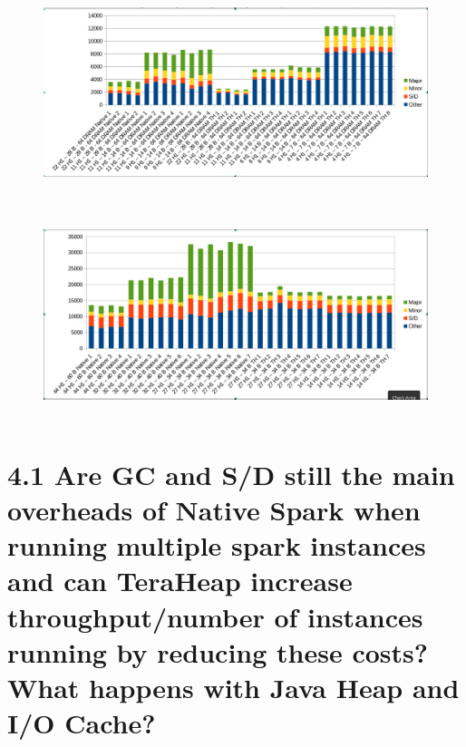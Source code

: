 \documentclass[twocolumn,10pt]{asme2e}
\begin{document}
\begin{figure}[h!]
        \includegraphics[width=12cm,height=6cm]{pr64.png}
\end{figure}

\begin{figure}[h!]
        \includegraphics[width=12cm,height=6cm]{pr256.png}
\end{figure}

\section*{4.1 Are GC and S/D still the main overheads of Native Spark when running multiple spark instances and can TeraHeap increase throughput/number of instances running by reducing these costs? What happens with Java Heap and I/O Cache?}
\end{document}
